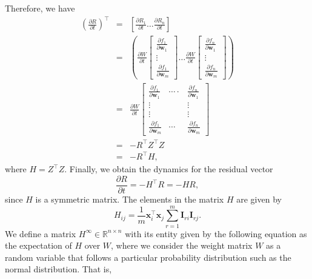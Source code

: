 \documentclass[letterpaper,12pt]{article}
\begin{document}
Therefore, we have
\begin{eqnarray}
\left(\frac{\partial R}{\partial t}\right)^{\top}&=&\left[\frac{\partial R_{1}}{\partial t} \ldots \frac{\partial R_{n}}{\partial t}\right]\\
&=&\left(\frac{\partial W}{\partial t}\left[\begin{array}{c}
\frac{\partial f_{1}}{\partial \mathbf{w}_{1}} \\
\vdots \\
\frac{\partial f_{1}}{\partial \mathbf{w}_{m}}
\end{array}\right] \ldots \frac{\partial W}{\partial t}\left[\begin{array}{c}
\frac{\partial f_{n}}{\partial \mathbf{w}_{1}} \\
\vdots \\
\frac{\partial f_{n}}{\partial \mathbf{w}_{m}}
\end{array}\right]\right)\\
&=&\frac{\partial W}{\partial t}\left[\begin{array}{ccc}
\frac{\partial f_{1}}{\partial \mathbf{w}_{1}} & \cdots \cdot & \frac{\partial f_{n}}{\partial \mathbf{w}_{1}} \\
\vdots&&\vdots\\
\vdots&&\vdots\\
\frac{\partial f_{1}}{\partial \mathbf{w}_{m}} & \cdots & \frac{\partial f_{n}}{\partial \mathbf{w}_{m}}
\end{array}\right]\\
&=&-R^{\top}Z^{\top}Z\\
&=&-R^{\top}H,
\end{eqnarray}
where $H=Z^{\top}Z$. Finally, we obtain the dynamics for the residual vector 
\begin{equation}
    \frac{\partial R}{\partial t}=-H^{\top} R=-HR,
\end{equation}
since $H$ is a symmetric matrix. The elements in the matrix $H$ are given by 
\begin{equation} \label{eq:H}
H_{i j}=\frac{1}{m} \mathbf{x}_{i}^{\top} \mathbf{x}_{j} \sum_{r=1}^{m} \mathbf{I}_{r i} \mathbf{I}_{r j}.
\end{equation}
We define a matrix ${H}^{\infty}  \in \mathbb{R}^{n \times n}$ with its entity given by the following equation as the expectation of $H$ over $W$, where we consider the weight matrix $W$ as a random variable that follows a particular probability distribution such as the normal distribution. That is,
\end{document}
